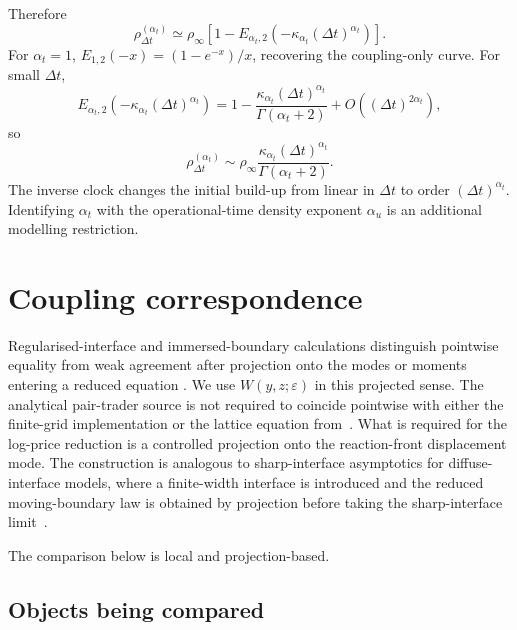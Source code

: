 \documentclass[5p,final]{elsarticle}
\begin{document}
Therefore
\begin{equation}
    \rho_{\Delta t}^{(\alpha_t)}
    \simeq
    \rho_\infty\left[1-E_{\alpha_t,2}
    (-\kappa_{\alpha_t}(\Delta t)^{\alpha_t})\right].
\end{equation}
For $\alpha_t=1$, $E_{1,2}(-x)=(1-e^{-x})/x$, recovering the coupling-only curve. For small $\Delta t$,
\begin{equation}
    E_{\alpha_t,2}(-\kappa_{\alpha_t}(\Delta t)^{\alpha_t})
    =1-\frac{\kappa_{\alpha_t}(\Delta t)^{\alpha_t}}
    {\Gamma(\alpha_t+2)}
    +O((\Delta t)^{2\alpha_t}),
\end{equation}
so
\begin{equation}
    \rho_{\Delta t}^{(\alpha_t)}
    \sim
    \rho_\infty\frac{\kappa_{\alpha_t}(\Delta t)^{\alpha_t}}
    {\Gamma(\alpha_t+2)}.
\end{equation}
The inverse clock changes the initial build-up from linear in $\Delta t$ to order $(\Delta t)^{\alpha_t}$. Identifying $\alpha_t$ with the operational-time density exponent $\alpha_u$ is an additional modelling restriction.

\section{Coupling correspondence}\label{app:coupling-equivalence}

Regularised-interface and immersed-boundary calculations distinguish pointwise equality from weak agreement after projection onto the modes or moments entering a reduced equation \cite{ElderGrantProvatasKosterlitz2001,Peskin2002,OlssonKreiss2005,DesjardinsMoureauPitsch2008}. We use \(W(y,z;\varepsilon)\) in this projected sense. The analytical pair-trader source is not required to coincide pointwise with either the finite-grid implementation or the lattice equation from~\cite{BauerDianaGebbie2024}. What is required for the log-price reduction is a controlled projection onto the reaction-front displacement mode.
The construction is analogous to sharp-interface asymptotics for diffuse-interface models, where a finite-width interface is introduced and the reduced moving-boundary law is obtained by projection before taking the sharp-interface limit~\cite{ElderGrantProvatasKosterlitz2001}.

The comparison below is local and projection-based. 

\subsection{Objects being compared}
\end{document}

